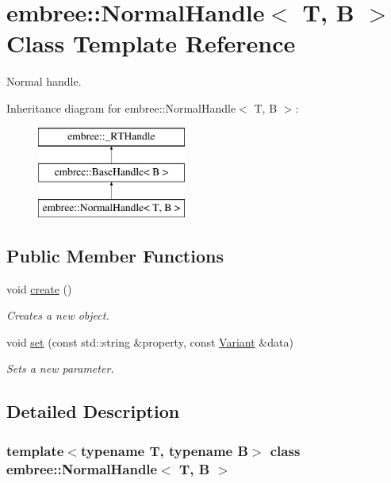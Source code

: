 \hypertarget{classembree_1_1_normal_handle}{
\section{embree::NormalHandle$<$ T, B $>$ Class Template Reference}
\label{classembree_1_1_normal_handle}
}


Normal handle.  


Inheritance diagram for embree::NormalHandle$<$ T, B $>$:\begin{figure}[H]
\begin{center}
\leavevmode
\includegraphics[height=3.000000cm]{classembree_1_1_normal_handle}
\end{center}
\end{figure}
\subsection*{Public Member Functions}
\begin{DoxyCompactItemize}
\item 
void \hyperlink{classembree_1_1_normal_handle_a1fb9da16f5c22098ee817fcdf2ce99e8}{create} ()
\begin{DoxyCompactList}\small\item\em Creates a new object. \item\end{DoxyCompactList}\item 
void \hyperlink{classembree_1_1_normal_handle_a7ff8ed45dbe48d6c86b673665475d6d5}{set} (const std::string \&property, const \hyperlink{structembree_1_1_variant}{Variant} \&data)
\begin{DoxyCompactList}\small\item\em Sets a new parameter. \item\end{DoxyCompactList}\end{DoxyCompactItemize}


\subsection{Detailed Description}
\subsubsection*{template$<$typename T, typename B$>$ class embree::NormalHandle$<$ T, B $>$}

